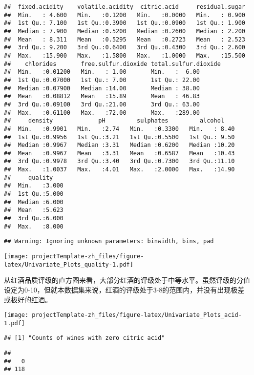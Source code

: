\documentclass[]{article}
\begin{document}
\begin{verbatim}
##  fixed.acidity    volatile.acidity  citric.acid     residual.sugar  
##  Min.   : 4.600   Min.   :0.1200   Min.   :0.0000   Min.   : 0.900  
##  1st Qu.: 7.100   1st Qu.:0.3900   1st Qu.:0.0900   1st Qu.: 1.900  
##  Median : 7.900   Median :0.5200   Median :0.2600   Median : 2.200  
##  Mean   : 8.311   Mean   :0.5295   Mean   :0.2723   Mean   : 2.523  
##  3rd Qu.: 9.200   3rd Qu.:0.6400   3rd Qu.:0.4300   3rd Qu.: 2.600  
##  Max.   :15.900   Max.   :1.5800   Max.   :1.0000   Max.   :15.500  
##    chlorides       free.sulfur.dioxide total.sulfur.dioxide
##  Min.   :0.01200   Min.   : 1.00       Min.   :  6.00      
##  1st Qu.:0.07000   1st Qu.: 7.00       1st Qu.: 22.00      
##  Median :0.07900   Median :14.00       Median : 38.00      
##  Mean   :0.08812   Mean   :15.89       Mean   : 46.83      
##  3rd Qu.:0.09100   3rd Qu.:21.00       3rd Qu.: 63.00      
##  Max.   :0.61100   Max.   :72.00       Max.   :289.00      
##     density             pH         sulphates         alcohol     
##  Min.   :0.9901   Min.   :2.74   Min.   :0.3300   Min.   : 8.40  
##  1st Qu.:0.9956   1st Qu.:3.21   1st Qu.:0.5500   1st Qu.: 9.50  
##  Median :0.9967   Median :3.31   Median :0.6200   Median :10.20  
##  Mean   :0.9967   Mean   :3.31   Mean   :0.6587   Mean   :10.43  
##  3rd Qu.:0.9978   3rd Qu.:3.40   3rd Qu.:0.7300   3rd Qu.:11.10  
##  Max.   :1.0037   Max.   :4.01   Max.   :2.0000   Max.   :14.90  
##     quality     
##  Min.   :3.000  
##  1st Qu.:5.000  
##  Median :6.000  
##  Mean   :5.623  
##  3rd Qu.:6.000  
##  Max.   :8.000
\end{verbatim}

\begin{verbatim}
## Warning: Ignoring unknown parameters: binwidth, bins, pad
\end{verbatim}

\texttt{[image: projectTemplate-zh\_files/figure-latex/Univariate\_Plots\_quality-1.pdf]}

从红酒品质评级的直方图来看，大部分红酒的评级处于中等水平。虽然评级的分值设定为0-10，但就本数据集来说，红酒的评级处于3-8的范围内，并没有出现极差或极好的红酒。

\texttt{[image: projectTemplate-zh\_files/figure-latex/Univariate\_Plots\_acid-1.pdf]}

\begin{verbatim}
## [1] "Counts of wines with zero citric acid"
\end{verbatim}

\begin{verbatim}
## 
##   0 
## 118
\end{verbatim}
\end{document}
